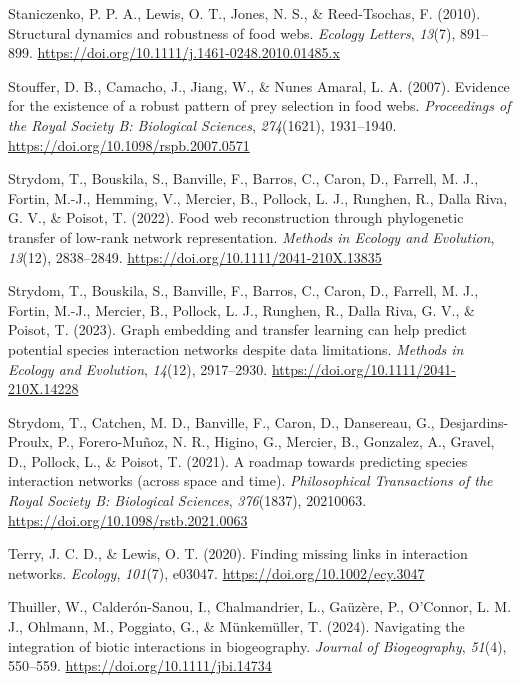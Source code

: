 \documentclass[
]{article}
\newlength{\cslhangindent}
\newenvironment{CSLReferences}[2] %
 {\begin{list}{}{%
  \setlength{\itemindent}{0pt}
  \setlength{\leftmargin}{0pt}
  \setlength{\parsep}{0pt}
  \ifodd #1
   \setlength{\leftmargin}{\cslhangindent}
   \setlength{\itemindent}{-1\cslhangindent}
  \fi
  \setlength{\itemsep}{#2\baselineskip}}}
 {\end{list}}
\begin{document}
\begin{CSLReferences}{1}{0}
Staniczenko, P. P. A., Lewis, O. T., Jones, N. S., \& Reed-Tsochas, F.
(2010). Structural dynamics and robustness of food webs. \emph{Ecology
Letters}, \emph{13}(7), 891--899.
\url{https://doi.org/10.1111/j.1461-0248.2010.01485.x}

Stouffer, D. B., Camacho, J., Jiang, W., \& Nunes Amaral, L. A. (2007).
Evidence for the existence of a robust pattern of prey selection in food
webs. \emph{Proceedings of the Royal Society B: Biological Sciences},
\emph{274}(1621), 1931--1940.
\url{https://doi.org/10.1098/rspb.2007.0571}

Strydom, T., Bouskila, S., Banville, F., Barros, C., Caron, D., Farrell,
M. J., Fortin, M.-J., Hemming, V., Mercier, B., Pollock, L. J., Runghen,
R., Dalla Riva, G. V., \& Poisot, T. (2022). Food web reconstruction
through phylogenetic transfer of low-rank network representation.
\emph{Methods in Ecology and Evolution}, \emph{13}(12), 2838--2849.
\url{https://doi.org/10.1111/2041-210X.13835}

Strydom, T., Bouskila, S., Banville, F., Barros, C., Caron, D., Farrell,
M. J., Fortin, M.-J., Mercier, B., Pollock, L. J., Runghen, R., Dalla
Riva, G. V., \& Poisot, T. (2023). Graph embedding and transfer learning
can help predict potential species interaction networks despite data
limitations. \emph{Methods in Ecology and Evolution}, \emph{14}(12),
2917--2930. \url{https://doi.org/10.1111/2041-210X.14228}

Strydom, T., Catchen, M. D., Banville, F., Caron, D., Dansereau, G.,
Desjardins-Proulx, P., Forero-Muñoz, N. R., Higino, G., Mercier, B.,
Gonzalez, A., Gravel, D., Pollock, L., \& Poisot, T. (2021). A roadmap
towards predicting species interaction networks (across space and time).
\emph{Philosophical Transactions of the Royal Society B: Biological
Sciences}, \emph{376}(1837), 20210063.
\url{https://doi.org/10.1098/rstb.2021.0063}

Terry, J. C. D., \& Lewis, O. T. (2020). Finding missing links in
interaction networks. \emph{Ecology}, \emph{101}(7), e03047.
\url{https://doi.org/10.1002/ecy.3047}

Thuiller, W., Calderón-Sanou, I., Chalmandrier, L., Gaüzère, P.,
O'Connor, L. M. J., Ohlmann, M., Poggiato, G., \& Münkemüller, T.
(2024). Navigating the integration of biotic interactions in
biogeography. \emph{Journal of Biogeography}, \emph{51}(4), 550--559.
\url{https://doi.org/10.1111/jbi.14734}


\end{CSLReferences}
\end{document}
